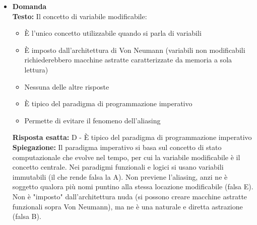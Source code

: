 \documentclass[12pt, a4paper]{article}
\newcounter{domandateoria}
\begin{document}
\begin{itemize}
    \item {}\textbf{Domanda \thedomandateoria} \\
    \textbf{Testo:} Il concetto di variabile modificabile:
    \begin{itemize}
        \item[A)] È l'unico concetto utilizzabile quando si parla di variabili
        \item[B)] È imposto dall'architettura di Von Neumann (variabili non modificabili richiederebbero macchine astratte caratterizzate da memoria a sola lettura)
        \item[C)] Nessuna delle altre risposte
        \item[D)] È tipico del paradigma di programmazione imperativo
        \item[E)] Permette di evitare il fenomeno dell'aliasing
    \end{itemize}
    \textbf{Risposta esatta:} D - È tipico del paradigma di programmazione imperativo \\
    \textbf{Spiegazione:} Il paradigma imperativo si basa sul concetto di stato computazionale che evolve nel tempo, per cui la variabile modificabile è il concetto centrale. Nei paradigmi funzionali e logici si usano variabili immutabili (il che rende falsa la A). Non previene l'aliasing, anzi ne è soggetto qualora più nomi puntino alla stessa locazione modificabile (falsa E). Non è "imposto" dall'architettura nuda (si possono creare macchine astratte funzionali sopra Von Neumann), ma ne è una naturale e diretta astrazione (falsa B).
    \vspace{0.3cm}
\end{itemize}
\end{document}
